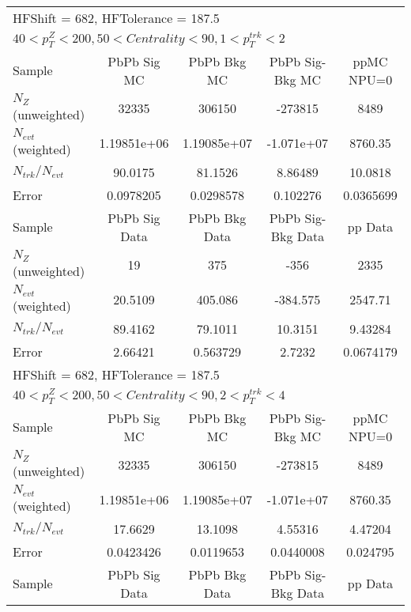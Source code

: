 \clearpage
\begin{table}[h!]
\centering
\begin{tabular}{|l|c|c|c|c|}
\multicolumn{5}{l}{ HFShift = 682, HFTolerance = 187.5}\\
\multicolumn{5}{l}{ $40 < p_{T}^{Z} < 200, 50 < Centrality < 90, 1 < p_{T}^{trk} < 2$}\\
\hline\hline
Sample         & PbPb Sig MC    & PbPb Bkg MC    & PbPb Sig-Bkg MC& ppMC NPU=0     \\
$N_Z$ (unweighted)& 32335          & 306150         & -273815        & 8489           \\
$N_{evt}$ (weighted)& 1.19851e+06    & 1.19085e+07    & -1.071e+07     & 8760.35        \\
$N_{trk}/N_{evt}$& 90.0175        & 81.1526        & 8.86489        & 10.0818        \\
Error          & 0.0978205      & 0.0298578      & 0.102276       & 0.0365699      \\
\hline
Sample         & PbPb Sig Data  & PbPb Bkg Data  & PbPb Sig-Bkg Data& pp Data  \\
$N_Z$ (unweighted)& 19             & 375            & -356           & 2335           \\
$N_{evt}$ (weighted)& 20.5109        & 405.086        & -384.575       & 2547.71        \\
$N_{trk}/N_{evt}$& 89.4162        & 79.1011        & 10.3151        & 9.43284        \\
Error          & 2.66421        & 0.563729       & 2.7232         & 0.0674179      \\
\hline\hline
\multicolumn{5}{l}{ HFShift = 682, HFTolerance = 187.5}\\
\multicolumn{5}{l}{ $40 < p_{T}^{Z} < 200, 50 < Centrality < 90, 2 < p_{T}^{trk} < 4$}\\
\hline\hline
Sample         & PbPb Sig MC    & PbPb Bkg MC    & PbPb Sig-Bkg MC& ppMC NPU=0     \\
$N_Z$ (unweighted)& 32335          & 306150         & -273815        & 8489           \\
$N_{evt}$ (weighted)& 1.19851e+06    & 1.19085e+07    & -1.071e+07     & 8760.35        \\
$N_{trk}/N_{evt}$& 17.6629        & 13.1098        & 4.55316        & 4.47204        \\
Error          & 0.0423426      & 0.0119653      & 0.0440008      & 0.024795       \\
\hline
Sample         & PbPb Sig Data  & PbPb Bkg Data  & PbPb Sig-Bkg Data& pp Data  \\

\end{tabular}
\end{table}
